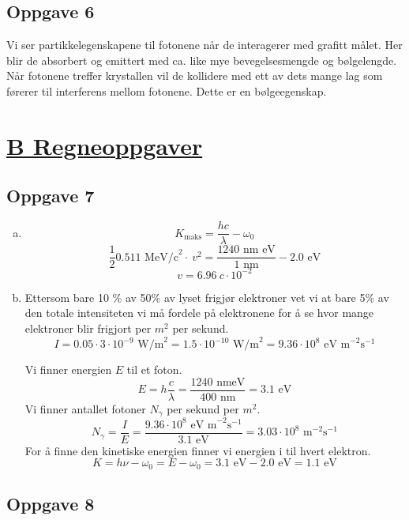 \documentclass{article}
\begin{document}
\subsection*{Oppgave 6}
Vi ser partikkelegenskapene til fotonene når de interagerer med grafitt målet. Her blir de absorbert og emittert med ca. like mye bevegelsesmengde og bølgelengde. Når fotonene treffer krystallen vil de kollidere med ett av dets mange lag som førerer til interferens mellom fotonene. Dette er en bølgeegenskap. 

\newpage
\section*{\underline{B Regneoppgaver}}
\subsection*{Oppgave 7}
\begin{enumerate}[a)]

  \item 

\[
K_{\text{maks}} = \frac{hc}{λ} - ω_0  
\]
\[
 \frac{1}{2} 0.511 \text{ MeV/c}^{2} ⋅  \ v^{2} = \frac{1240 \text{ nm eV}}{1 \text{ nm}} - 2.0 \text{ eV}
\]
\[
v = 6.96\ c ⋅ 10^{-2}
\]

  \item Ettersom bare 10 \% av 50\% av lyset frigjør elektroner vet vi at bare 5\% av den totale intensiteten vi må fordele på elektronene for å se hvor mange elektroner blir frigjort per $m^{2}$ per sekund.  
\[
I = 0.05 ⋅ 3 ⋅  10^{-9} \text{ W/m}^{2} = 1.5 ⋅ 10^{-10} \text{ W/m}^{2} = 9.36 ⋅ 10^{8} \text{ eV m}^{-2}\text{s}^{-1}
\]

Vi finner energien $E$ til et foton.
\[
E = h \frac{c}{λ} = \frac{1240 \text{ nmeV}}{400 \text{ nm}} = 3.1 \text{ eV}
\]
Vi finner antallet fotoner $N_{γ}$ per sekund per $m^{2}$. 
\[
N_{γ} = \frac{I}{E} = \frac{9.36 \cdot 10^{8} \text{ eV m}^{-2}\text{s}^{-1}}{3.1 \text{ eV}} = 3.03 \cdot 10^{8} \text{ m}^{-2}\text{s}^{-1}
\]
For å finne den kinetiske energien finner vi energien i til hvert elektron.  
\[
K = hν - ω_0 = E - ω_0 = 3.1 \text{ eV} - 2.0 \text{ eV} = 1.1 \text{ eV}
\]
\end{enumerate}

\subsection*{Oppgave 8}
\end{document}
